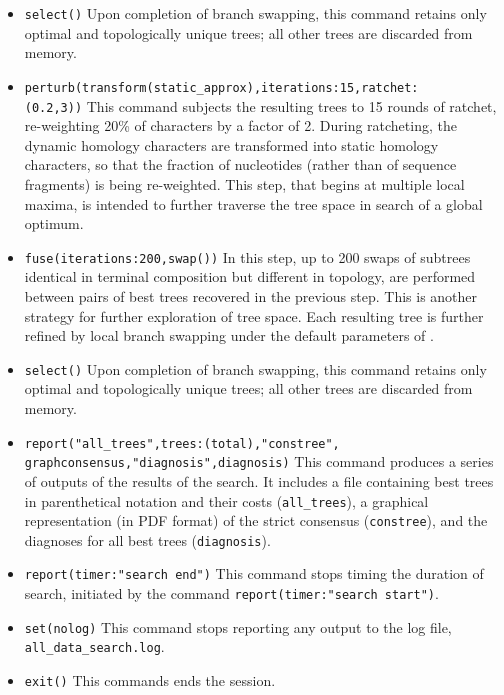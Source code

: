 \begin{itemize}
\item \texttt{select()} Upon completion of branch swapping, this command retains only optimal and topologically unique trees; all other trees are discarded from memory. 
\item \texttt{perturb(transform(static\_approx),iterations:15,ratchet:\\(0.2,3))} This command subjects the resulting trees to 15 rounds of ratchet, re-weighting 20\% of characters by a factor of 2. During ratcheting, the dynamic homology characters are transformed into static homology characters, so that the fraction of nucleotides (rather than of sequence fragments) is being re-weighted. This step, that begins at multiple local maxima, is intended to further traverse the tree space in search of a global optimum.
\item \texttt{fuse(iterations:200,swap())} In this step, up to 200 swaps of subtrees identical in terminal composition but different in topology, are performed between pairs of best trees recovered in the previous step. This is another strategy for further exploration of tree space. Each resulting tree is further refined by local branch swapping under the default parameters of .
\item \texttt{select()} Upon completion of branch swapping, this command retains only optimal and topologically unique trees; all other trees are discarded from memory.
\item \texttt{report("all\_trees",trees:(total),"constree",\\graphconsensus,"diagnosis",diagnosis)} This command produces a series of outputs of the results of the search. It includes a file containing best trees in parenthetical notation and their costs (\texttt{all\_trees}), a graphical representation (in PDF format) of the strict consensus (\texttt{constree}), and the diagnoses for all best trees (\texttt{diagnosis}).
\item \texttt{report(timer:"search end")} This command stops timing the duration of search, initiated by the command \texttt{report(timer:"search start")}.
\item \texttt{set(nolog)} This command stops reporting any output to the log file, \texttt{all\_data\_search.log}.
\item \texttt{exit()} This commands ends the \poy session.
\end{itemize}


